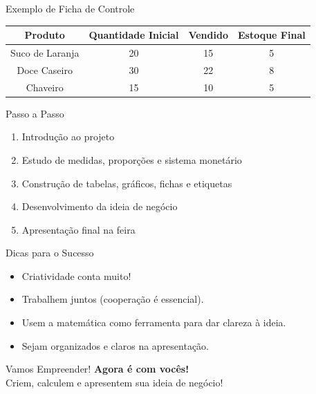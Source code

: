 \documentclass{beamer}
\begin{document}
\begin{frame}{Exemplo de Ficha de Controle}
\centering
\begin{tabular}{|c|c|c|c|}
\hline
Produto & Quantidade Inicial & Vendido & Estoque Final \\
\hline
Suco de Laranja & 20 & 15 & 5 \\
Doce Caseiro & 30 & 22 & 8 \\
Chaveiro & 15 & 10 & 5 \\
\hline
\end{tabular}
\end{frame}

\begin{frame}{Passo a Passo}
    \begin{enumerate}
        \item Introdução ao projeto
        \item Estudo de medidas, proporções e sistema monetário
        \item Construção de tabelas, gráficos, fichas e etiquetas
        \item Desenvolvimento da ideia de negócio
        \item Apresentação final na feira
    \end{enumerate}
\end{frame}

\begin{frame}{Dicas para o Sucesso}
    \begin{itemize}
        \item Criatividade conta muito!
        \item Trabalhem juntos (cooperação é essencial).
        \item Usem a matemática como ferramenta para dar clareza à ideia.
        \item Sejam organizados e claros na apresentação.
    \end{itemize}
\end{frame}

\begin{frame}{Vamos Empreender!}
    \centering
    \Huge \textbf{Agora é com vocês!} \\
    \vspace{0.5cm}
    \Large Criem, calculem e apresentem sua ideia de negócio! 🚀
\end{frame}
\end{document}
